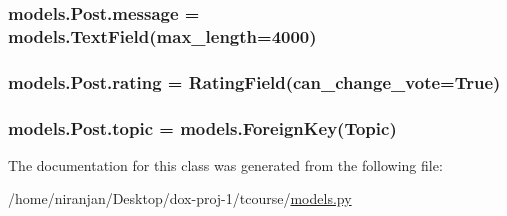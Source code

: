 \subsubsection[{\texorpdfstring{message}{message}}]{\setlength{\rightskip}{0pt plus 5cm}models.\+Post.\+message = models.\+Text\+Field(max\+\_\+length=4000)\hspace{0.3cm}{\ttfamily [static]}}\hypertarget{classmodels_1_1_post_ad66c792a53f3c3e39cac8e7c2efec323}{}\label{classmodels_1_1_post_ad66c792a53f3c3e39cac8e7c2efec323}
\subsubsection[{\texorpdfstring{rating}{rating}}]{\setlength{\rightskip}{0pt plus 5cm}models.\+Post.\+rating = Rating\+Field(can\+\_\+change\+\_\+vote=True)\hspace{0.3cm}{\ttfamily [static]}}\hypertarget{classmodels_1_1_post_ade8df96ef07130fe7304225c1d1f326d}{}\label{classmodels_1_1_post_ade8df96ef07130fe7304225c1d1f326d}
\subsubsection[{\texorpdfstring{topic}{topic}}]{\setlength{\rightskip}{0pt plus 5cm}models.\+Post.\+topic = models.\+Foreign\+Key({\bf Topic})\hspace{0.3cm}{\ttfamily [static]}}\hypertarget{classmodels_1_1_post_a8b375c00f4324d267ef2ad27cf603c8c}{}\label{classmodels_1_1_post_a8b375c00f4324d267ef2ad27cf603c8c}


The documentation for this class was generated from the following file\+:\begin{DoxyCompactItemize}
\item 
/home/niranjan/\+Desktop/dox-\/proj-\/1/tcourse/\hyperlink{models_8py}{models.\+py}\end{DoxyCompactItemize}
